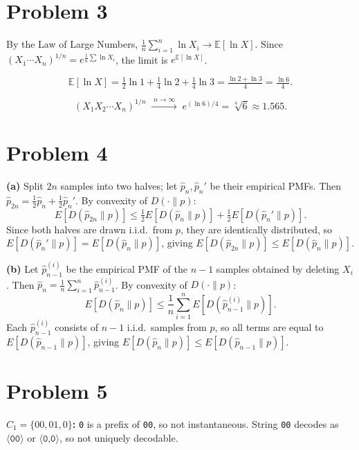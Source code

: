 \documentclass[11pt,a4paper]{article}
\begin{document}
\section*{Problem 3}

By the Law of Large Numbers, $\frac{1}{n}\sum_{i=1}^n \ln X_i \to \mathbb{E}[\ln X]$.
Since $(X_1\cdots X_n)^{1/n} = e^{\frac{1}{n}\sum \ln X_i}$, the limit is $e^{\mathbb{E}[\ln X]}$.

\[
  \mathbb{E}[\ln X]
  = \tfrac{1}{2}\ln 1 + \tfrac{1}{4}\ln 2 + \tfrac{1}{4}\ln 3
  = \tfrac{\ln 2 + \ln 3}{4}
  = \tfrac{\ln 6}{4}.
\]

\[
  \boxed{(X_1 X_2\cdots X_n)^{1/n} \;\xrightarrow{\;n\to\infty\;}\; e^{(\ln 6)/4} = \sqrt[4]{6} \approx 1.565.}
\]

\section*{Problem 4}

\textbf{(a)} Split $2n$ samples into two halves; let $\hat{p}_n,\hat{p}_n'$ be their empirical PMFs.
Then $\hat{p}_{2n}=\frac{1}{2}\hat{p}_n+\frac{1}{2}\hat{p}_n'$.
By convexity of $D(\cdot\|p)$:
\[
  E[D(\hat{p}_{2n}\|p)]
  \le \tfrac{1}{2}E[D(\hat{p}_n\|p)]+\tfrac{1}{2}E[D(\hat{p}_n'\|p)].
\]
Since both halves are drawn i.i.d.\ from $p$, they are identically distributed,
so $E[D(\hat{p}_n'\|p)]=E[D(\hat{p}_n\|p)]$, giving
$E[D(\hat{p}_{2n}\|p)]\le E[D(\hat{p}_n\|p)]$.

\textbf{(b)} Let $\hat{p}_{n-1}^{(i)}$ be the empirical PMF of the $n-1$ samples obtained by deleting $X_i$.
Then $\hat{p}_n=\frac{1}{n}\sum_{i=1}^{n}\hat{p}_{n-1}^{(i)}$.
By convexity of $D(\cdot\|p)$:
\[
  E[D(\hat{p}_n\|p)]
  \le \frac{1}{n}\sum_{i=1}^{n}E[D(\hat{p}_{n-1}^{(i)}\|p)].
\]
Each $\hat{p}_{n-1}^{(i)}$ consists of $n-1$ i.i.d.\ samples from $p$,
so all terms are equal to $E[D(\hat{p}_{n-1}\|p)]$, giving
$E[D(\hat{p}_n\|p)]\le E[D(\hat{p}_{n-1}\|p)]$.

\section*{Problem 5}

\textbf{$C_1=\{00,01,0\}$:} \texttt{0} is a prefix of \texttt{00}, so not instantaneous.
String \texttt{00} decodes as $\langle\texttt{00}\rangle$ or $\langle\texttt{0,0}\rangle$, so not uniquely decodable.
\end{document}
